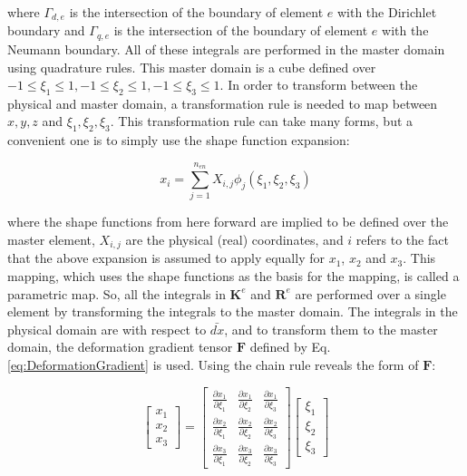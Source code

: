 \documentclass[10pt]{article}
\begin{document}
where \(\Gamma_{d,e}\) is the intersection of the boundary of element \(e\) with the Dirichlet boundary and \(\Gamma_{q,e}\) is the intersection of the boundary of element \(e\) with the Neumann boundary. All of these integrals are performed in the master domain using quadrature rules. This master domain is a cube defined over \(-1\leq\xi_1\leq1, -1\leq\xi_2\leq1, -1\leq\xi_3\leq1\). In order to transform between the physical and master domain, a transformation rule is needed to map between \(x,y,z\) and \(\xi_1,\xi_2,\xi_3\). This transformation rule can take many forms, but a convenient one is to simply use the shape function expansion:

\begin{equation}
x_i=\sum_{j=1}^{n_{en}}X_{i,j}\phi_j(\xi_1,\xi_2,\xi_3)
\end{equation}

where the shape functions from here forward are implied to be defined over the master element, \(X_{i,j}\) are the physical (real) coordinates, and \(i\) refers to the fact that the above expansion is assumed to apply equally for \(x_1\), \(x_2\) and \(x_3\). This mapping, which uses the shape functions as the basis for the mapping, is called a parametric map. So, all the integrals in \(\textbf{K}^e\) and \(\textbf{R}^e\) are performed over a single element by transforming the integrals to the master domain. The integrals in the physical domain are with respect to \(\bar{dx}\), and to transform them to the master domain, the deformation gradient tensor \(\textbf{F}\) defined by Eq. \eqref{eq:DeformationGradient} is used. Using the chain rule reveals the form of \(\textbf{F}\):

\begin{equation}
\label{eq:FForm}
\begin{bmatrix}x_1\\x_2\\x_3\end{bmatrix}=
\begin{bmatrix}\frac{\partial x_1}{\partial \xi_1}&\frac{\partial x_1}{\partial \xi_2}&\frac{\partial x_1}{\partial \xi_3}\\
\frac{\partial x_2}{\partial \xi_1}&\frac{\partial x_2}{\partial \xi_2}&\frac{\partial x_2}{\partial \xi_3}\\
\frac{\partial x_3}{\partial \xi_1}&\frac{\partial x_3}{\partial \xi_2}&\frac{\partial x_3}{\partial \xi_3}\end{bmatrix}
\begin{bmatrix}\xi_1\\\xi_2\\\xi_3\end{bmatrix}
\end{equation}
\end{document}
